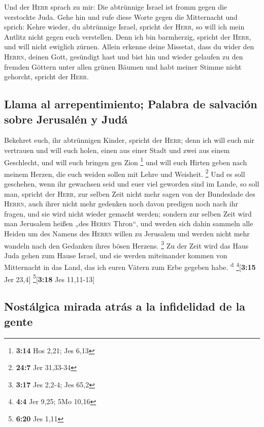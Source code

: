  Und der \textsc{Herr} sprach zu mir: Die abtrünnige
Israel ist fromm gegen die verstockte Juda.  Gehe hin und
rufe diese Worte gegen die Mitternacht und sprich: Kehre wieder, du
abtrünnige Israel, spricht der \textsc{Herr}, so will ich mein Antlitz
nicht gegen euch verstellen. Denn ich bin barmherzig, spricht der
\textsc{Herr}, und will nicht ewiglich zürnen.  Allein
erkenne deine Missetat, dass du wider den \textsc{Herrn}, deinen Gott,
gesündigt hast und bist hin und wieder gelaufen zu den fremden Göttern
unter allen grünen Bäumen und habt meiner Stimme nicht gehorcht, spricht
der \textsc{Herr}.

\hypertarget{llama-al-arrepentimiento-palabra-de-salvaciuxf3n-sobre-jerusaluxe9n-y-juduxe1}{%
\subsection{Llama al arrepentimiento; Palabra de salvación sobre
Jerusalén y
Judá}\label{llama-al-arrepentimiento-palabra-de-salvaciuxf3n-sobre-jerusaluxe9n-y-juduxe1}}

 Bekehret euch, ihr abtrünnigen Kinder, spricht der
\textsc{Herr}; denn ich will euch mir vertrauen und will euch holen,
einen aus einer Stadt und zwei aus einem Geschlecht, und will euch
bringen gen Zion \footnote{\textbf{3:14} Hos 2,21; Jes 6,13}
 und will euch Hirten geben nach meinem Herzen, die euch
weiden sollen mit Lehre und Weisheit. \footnote{\textbf{24:7} Jer
  31,33-34}  Und es soll geschehen, wenn ihr gewachsen
seid und euer viel geworden sind im Lande, so soll man, spricht der
\textsc{Herr}, zur selben Zeit nicht mehr sagen von der Bundeslade des
\textsc{Herrn}, auch ihrer nicht mehr gedenken noch davon predigen noch
nach ihr fragen, und sie wird nicht wieder gemacht werden;
 sondern zur selben Zeit wird man Jerusalem heißen „des
\textsc{Herrn} Thron``, und werden sich dahin sammeln alle Heiden um des
Namens des \textsc{Herrn} willen zu Jerusalem und werden nicht mehr
wandeln nach den Gedanken ihres bösen Herzens. \footnote{\textbf{3:17}
  Jes 2,2-4; Jes 65,2}  Zu der Zeit wird das Haus Juda
gehen zum Hause Israel, und sie werden miteinander kommen von
Mitternacht in das Land, das ich euren Vätern zum Erbe gegeben habe.
\textsuperscript{d} \footnote{\textbf{4:4} Jer 9,25; 5Mo 10,16}{[}\textbf{3:15}
Jer 23,4{]} \footnote{\textbf{6:20} Jes 1,11}{[}\textbf{3:18} Jes
11,11-13{]}

\hypertarget{nostuxe1lgica-mirada-atruxe1s-a-la-infidelidad-de-la-gente}{%
\subsection{Nostálgica mirada atrás a la infidelidad de la
gente}\label{nostuxe1lgica-mirada-atruxe1s-a-la-infidelidad-de-la-gente}}


